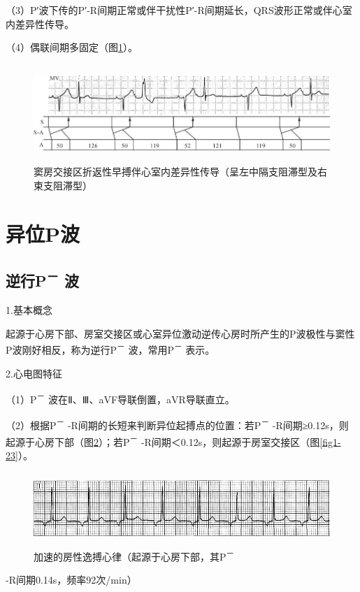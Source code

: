 （3）P′波下传的P′-R间期正常或伴干扰性P′-R间期延长，QRS波形正常或伴心室内差异性传导。

（4）偶联间期多固定（图\ref{fig1-21}）。

\begin{figure}[!htbp]
 \centering
 \includegraphics[width=5.79167in,height=1.45833in]{./images/Image00027.jpg}
 \captionsetup{justification=centering}
 \caption{窦房交接区折返性早搏伴心室内差异性传导（呈左中隔支阻滞型及右束支阻滞型）}
 \label{fig1-21}
  \end{figure} 

\protect\hypertarget{text00007.htmlux5cux23subid19}{}{}

\section{异位P波}

\protect\hypertarget{text00007.htmlux5cux23subid20}{}{}

\subsection{逆行P\textsuperscript{－} 波}

1.基本概念

起源于心房下部、房室交接区或心室异位激动逆传心房时所产生的P波极性与窦性P波刚好相反，称为逆行P\textsuperscript{－}
波，常用P\textsuperscript{－} 表示。

2.心电图特征

（1）P\textsuperscript{－} 波在Ⅱ、Ⅲ、aVF导联倒置，aVR导联直立。

（2）根据P\textsuperscript{－}
-R间期的长短来判断异位起搏点的位置：若P\textsuperscript{－}
-R间期≥0.12s，则起源于心房下部（图\ref{fig1-22}）；若P\textsuperscript{－}
-R间期＜0.12s，则起源于房室交接区（图\ref{fig1-23}）。

\begin{figure}[!htbp]
 \centering
 \includegraphics[width=5.58333in,height=1.07292in]{./images/Image00028.jpg}
 \captionsetup{justification=centering}
 \caption{加速的房性逸搏心律（起源于心房下部，其P\textsuperscript{－}}
 \label{fig1-22}
  \end{figure} 
-R间期0.14s，频率92次/min）

